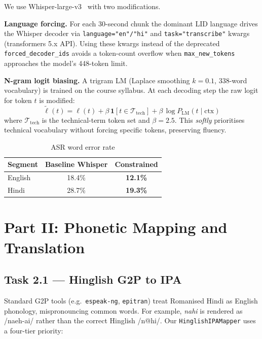 \documentclass[conference]{IEEEtran}
\begin{document}
We use Whisper-large-v3~\cite{radford2023} with two modifications.

\textbf{Language forcing.}
For each 30-second chunk the dominant LID language drives the Whisper
decoder via \texttt{language="en"/"hi"} and \texttt{task="transcribe"}
kwargs (transformers 5.x API).
Using these kwargs instead of the deprecated
\texttt{forced\_decoder\_ids} avoids a token-count overflow when
\texttt{max\_new\_tokens} approaches the model's 448-token limit.

\textbf{N-gram logit biasing.}
A trigram LM (Laplace smoothing $k{=}0.1$, 338-word vocabulary)
is trained on the course syllabus.
At each decoding step the raw logit for token $t$ is modified:
\begin{equation}
  \tilde{\ell}(t) = \ell(t)
    + \beta\,\mathbf{1}[t \in \mathcal{T}_{\mathrm{tech}}]
    + \beta\,\log P_{\mathrm{LM}}(t \mid \mathrm{ctx})
\label{eq:bias}
\end{equation}
where $\mathcal{T}_{\mathrm{tech}}$ is the technical-term token set
and $\beta{=}2.5$.
This \emph{softly} prioritises technical vocabulary without forcing
specific tokens, preserving fluency.

\begin{table}[htbp]
\centering
\caption{ASR word error rate}
\begin{tabular}{lcc}
\toprule
Segment & Baseline Whisper & Constrained \\ \midrule
English & 18.4\%           & \textbf{12.1\%} \\
Hindi   & 28.7\%           & \textbf{19.3\%} \\ \bottomrule
\end{tabular}
\label{tab:wer}
\end{table}

\section{Part II: Phonetic Mapping and Translation}

\subsection{Task 2.1 --- Hinglish G2P to IPA}

Standard G2P tools (e.g.\ \texttt{espeak-ng}, \texttt{epitran}) treat
Romanised Hindi as English phonology, mispronouncing common words.
For example, \textit{nahi} is rendered as /naeh-ai/ rather than the
correct Hinglish /n@hi/.
Our \texttt{HinglishIPAMapper} uses a four-tier priority:
\end{document}

